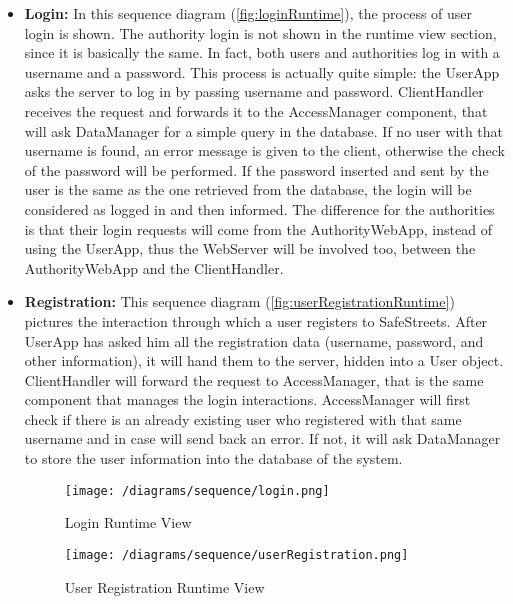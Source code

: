 			\begin{itemize}
				\item \textbf{Login:} In this sequence diagram (\autoref{fig:loginRuntime}), the process of user login is shown. The authority login is not shown in the runtime view section, since it is basically the same. In fact, both users and authorities log in with a username and a password. This process is actually quite simple: the UserApp asks the server to log in by passing username and password. ClientHandler receives the request and forwards it to the AccessManager component, that will ask DataManager for a simple query in the database. If no user with that username is found, an error message is given to the client, otherwise the check of the password will be performed. If the password inserted and sent by the user is the same as the one retrieved from the database, the login will be considered as logged in and then informed.
				The difference for the authorities is that their login requests will come from  the AuthorityWebApp, instead of using the UserApp, thus the WebServer will be involved too, between the AuthorityWebApp and the ClientHandler.
	
				\item \textbf{Registration:} This sequence diagram (\autoref{fig:userRegistrationRuntime}) pictures the interaction through which a user registers to SafeStreets. After UserApp has asked him all the registration data (username, password, and other information), it will hand them to the server, hidden into a User object. ClientHandler will forward the request to AccessManager, that is the same component that manages the login interactions. AccessManager will first check if there is an already existing user who registered with that same username and in case will send back an error. If not, it will ask DataManager to store the user information into the database of the system.
				
				\newpage
				
				\begin{figure}[h!]
					\centering
					\texttt{[image: /diagrams/sequence/login.png]}
					\caption{\label{fig:loginRuntime} Login Runtime View}
				\end{figure}
			
				\vspace{2cm}
				
				\begin{figure}[h!]
					\centering
					\texttt{[image: /diagrams/sequence/userRegistration.png]}
					\caption{\label{fig:userRegistrationRuntime} User Registration Runtime View}
				\end{figure}
			

\end{itemize}
